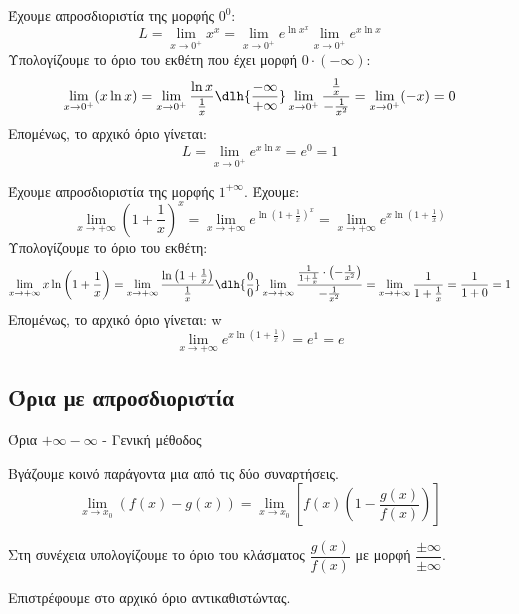 \lysh\vspace{-7mm}
\begin{alist}
\item Έχουμε απροσδιοριστία της μορφής $0^0$:
\[ L=\lim\limits_{x\to 0^+} x^x =\lim\limits_{x\to 0^+}{e^{\ln{x^x}}} \lim\limits_{x\to 0^+} e^{x\ln x} \]
Υπολογίζουμε το όριο του εκθέτη που έχει μορφή $0\cdot(-\infty)$:
\[ \lim\limits_{x\to 0^+} (x\ln x) = \lim\limits_{x\to 0^+} \dfrac{\ln x}{\frac{1}{x}} \dlh{\frac{-\infty}{+\infty}} \lim\limits_{x\to 0^+} \dfrac{\frac{1}{x}}{-\frac{1}{x^2}} = \lim\limits_{x\to 0^+} (-x) = 0 \]
Επομένως, το αρχικό όριο γίνεται:
\[ L=\lim\limits_{x\to 0^+} e^{x\ln x} = e^0 = 1 \]
\item Έχουμε απροσδιοριστία της μορφής $1^{+\infty}$. Έχουμε:
\[ \lim\limits_{x\to +\infty} \left(1+\frac{1}{x}\right)^x =\lim\limits_{x\to +\infty} e^{\ln\left(1+\frac{1}{x}\right)^x}= \lim\limits_{x\to +\infty} e^{x\ln\left(1+\frac{1}{x}\right)} \]
Υπολογίζουμε το όριο του εκθέτη:
\[ \lim\limits_{x\to +\infty} x\ln\left(1+\dfrac{1}{x}\right) = \lim\limits_{x\to +\infty} \dfrac{\ln\left(1+\frac{1}{x}\right)}{\frac{1}{x}} \dlh{\frac{0}{0}} \lim\limits_{x\to +\infty} \dfrac{\frac{1}{1+\frac{1}{x}}\cdot\left(-\frac{1}{x^2}\right)}{-\frac{1}{x^2}} = \lim\limits_{x\to +\infty} \frac{1}{1+\frac{1}{x}} = \frac{1}{1+0} = 1 \]
Επομένως, το αρχικό όριο γίνεται:
w\[ \lim\limits_{x\to +\infty} e^{x\ln\left(1+\frac{1}{x}\right)} = e^1 = e \]
\end{alist}
\subsection{Όρια με απροσδιοριστία \bmath{$ +\infty-\infty $}}
\begin{askhsh}{Όρια $ +\infty-\infty $ - Γενική μέθοδος}
\bhmata
\begin{bhma}
\item Βγάζουμε κοινό παράγοντα μια από τις δύο συναρτήσεις.
\[ \lim\limits_{x\to x_0}{(f(x)-g(x))}=\lim\limits_{x\to x_0}{\left[f(x)\left(1-\dfrac{g(x)}{f(x)}\right)\right]} \]
\item Στη συνέχεια υπολογίζουμε το όριο του κλάσματος $ \dfrac{g(x)}{f(x)} $ με μορφή $ \dfrac{\pm\infty}{\pm\infty} $.
\item Επιστρέφουμε στο αρχικό όριο αντικαθιστώντας.
\end{bhma}
\end{askhsh}

